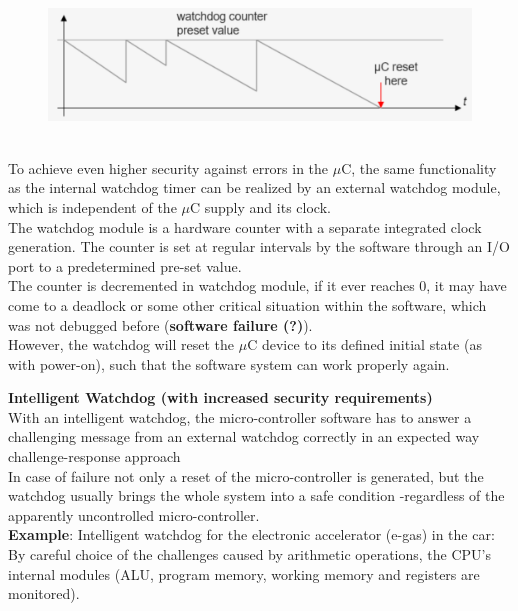     \begin{figure}[h]
    \centering
    \includegraphics[width=12cm, height=4cm]{Images/image164.png}
    \label{fig:Fig 117}
    \end{figure}

To achieve even higher security against errors in the $\mu$C, the same functionality as the internal watchdog timer can be realized by an external watchdog module, which is independent of the $\mu$C supply and its clock. \\

The watchdog module is a hardware counter with a separate integrated clock generation. The counter is set at regular intervals by the software through an I/O port to a predetermined pre-set value.\\

The counter is decremented in watchdog module, if it ever reaches 0, it may have come to a deadlock or some other critical situation within the software, which was not debugged before (\textbf{software failure (?)}). \\

However, the watchdog will reset the $\mu$C device to its defined initial state (as with power-on), such that the software system can work properly again.\\

\os{\newpage}

{\rot\bf Intelligent Watchdog (with increased security requirements)}\\

With an intelligent watchdog, the micro-controller software has to answer a challenging message from an external watchdog correctly in an expected way  challenge-response approach\\

In case of failure not only a reset of the micro-controller is generated, but the watchdog usually brings the whole system into a safe condition -regardless of the apparently uncontrolled micro-controller.\\

\textbf{Example}: Intelligent watchdog for the electronic accelerator (e-gas) in the car:\\
By careful choice of the challenges caused by arithmetic operations, the CPU's internal modules (ALU, program memory, working memory and registers are monitored).


